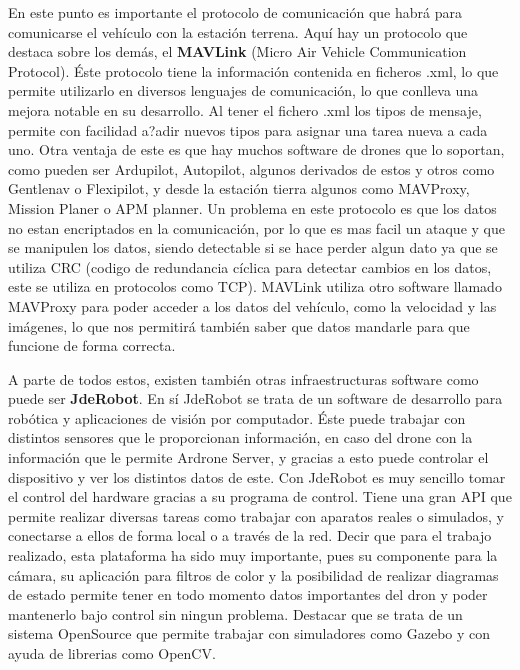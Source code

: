 \documentclass{article}
\begin{document}
\hspace{1 cm} En este punto es importante el protocolo de comunicaci\'on que habr\'a para comunicarse el veh\'iculo con la estaci\'on terrena. Aqu\'i hay un protocolo que destaca sobre los dem\'as, el \textbf{MAVLink} (Micro Air Vehicle Communication Protocol). \'Este protocolo tiene la informaci\'on contenida en ficheros .xml, lo que permite utilizarlo en diversos lenguajes de comunicaci\'on, lo que conlleva una mejora notable en su desarrollo. Al tener el fichero .xml los tipos de mensaje, permite con facilidad a?adir nuevos tipos para asignar una tarea nueva a cada uno. Otra ventaja de este es que hay muchos software de drones que lo soportan, como pueden ser Ardupilot, Autopilot, algunos derivados de estos y otros como Gentlenav o Flexipilot, y desde la estaci\'on tierra algunos como MAVProxy, Mission Planer o APM planner. 
Un problema en este protocolo es que los datos no estan encriptados en la comunicaci\'on, por lo que es mas facil un ataque y que se manipulen los datos, siendo detectable si se hace perder algun dato ya que se utiliza CRC (codigo de redundancia c\'iclica para detectar cambios en los datos, este se utiliza en protocolos como TCP).
MAVLink utiliza otro software llamado MAVProxy para poder acceder a los datos del veh\'iculo, como la velocidad y las im\'agenes, lo que nos permitir\'a tambi\'en saber que datos mandarle para que funcione de forma correcta. 

\hspace{1 cm} A parte de todos estos, existen tambi\'en otras infraestructuras software como puede ser \textbf{JdeRobot}. En s\'i JdeRobot se trata de un software de desarrollo para rob\'otica y aplicaciones de visi\'on por computador. \'Este puede trabajar con distintos sensores que le proporcionan informaci\'on, en caso del drone con la informaci\'on que le permite Ardrone Server, y gracias a esto puede controlar el dispositivo y ver los distintos datos de este. Con JdeRobot es muy sencillo tomar el control del hardware gracias a su programa de control. Tiene una gran API que permite realizar diversas tareas como trabajar con aparatos reales o simulados, y conectarse a ellos de forma local o a trav\'es de la red. Decir que para el trabajo realizado, esta plataforma ha sido muy importante, pues su componente para la c\'amara, su aplicaci\'on para filtros de color y la posibilidad de realizar diagramas de estado permite tener en todo momento datos importantes del dron y poder mantenerlo bajo control sin ningun problema. Destacar que se trata de un sistema OpenSource que permite trabajar con simuladores como Gazebo y con ayuda de librerias como OpenCV. 
 
\end{document}

